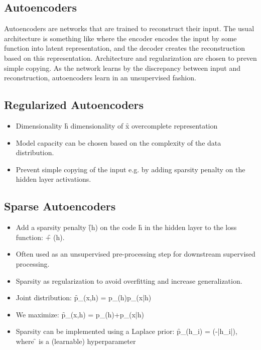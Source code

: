 \subsection{Autoencoders}
Autoencoders are networks that are trained to reconstruct their input. The usual architecture is something like
where the encoder encodes the input by some function into latent representation, and the decoder creates the reconstruction based on this representation. Architecture and regularization are chosen to preven simple copying. As the network learns by the discrepancy between input and reconstruction, autoencoders learn in an unsupervised fashion.

\subsection{Regularized Autoencoders}
\begin{itemize}
    \item Dimensionality \f{h \geq} dimensionality of \f{x \to} overcomplete representation
    \item Model capacity can be chosen based on the complexity of the data distribution.
    \item Prevent simple copying of the input e.g. by adding sparsity penalty on the hidden layer activations.
\end{itemize}

\subsection{Sparse Autoencoders}
\begin{itemize}
    \item Add a sparsity penalty \f{\Omega(h)} on the code \f{h} in the hidden layer to the loss function: \f{\fL + \Omega(h)}.
    \item Often used as an unsupervised pre-processing step for downstream supervised processing.
    \item Sparsity as regularization to avoid overfitting and increase generalization.
    \item Joint distribution: \f{p_{}(x,h) = p_{}(h)p_{}(x|h)}
    \item We maximize: \f{\log p_{}(x,h) = \log p_{}(h)+\log p_{}(x|h)}
    \item Sparsity can be implemented using a Laplace prior: \f{p_{}(h_i) = \exp(-\lambda|h_i|),} where \f{\lambda} is a (learnable) hyperparameter
\end{itemize}

